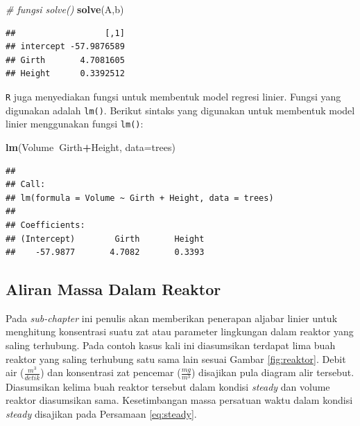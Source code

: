 \documentclass[]{book}
\newenvironment{Shaded}{\begin{snugshade}}{\end{snugshade}}
\newcommand{\CommentTok}[1]{\textcolor[rgb]{0.56,0.35,0.01}{\textit{#1}}}
\newcommand{\DataTypeTok}[1]{\textcolor[rgb]{0.13,0.29,0.53}{#1}}
\newcommand{\KeywordTok}[1]{\textcolor[rgb]{0.13,0.29,0.53}{\textbf{#1}}}
\newcommand{\NormalTok}[1]{#1}
\newcommand{\OperatorTok}[1]{\textcolor[rgb]{0.81,0.36,0.00}{\textbf{#1}}}
\theoremstyle{definition}
\theoremstyle{definition}
\theoremstyle{definition}
\theoremstyle{remark}
\begin{document}
\begin{Shaded}
\begin{Highlighting}[]
\CommentTok{# fungsi solve()}
\KeywordTok{solve}\NormalTok{(A,b)}
\end{Highlighting}
\end{Shaded}

\begin{verbatim}
##                  [,1]
## intercept -57.9876589
## Girth       4.7081605
## Height      0.3392512
\end{verbatim}

\texttt{R} juga menyediakan fungsi untuk membentuk model regresi linier. Fungsi yang digunakan adalah \texttt{lm()}. Berikut sintaks yang digunakan untuk membentuk model linier menggunakan fungsi \texttt{lm()}:

\begin{Shaded}
\begin{Highlighting}[]
\KeywordTok{lm}\NormalTok{(Volume}\OperatorTok{~}\NormalTok{Girth}\OperatorTok{+}\NormalTok{Height, }\DataTypeTok{data=}\NormalTok{trees)}
\end{Highlighting}
\end{Shaded}

\begin{verbatim}
## 
## Call:
## lm(formula = Volume ~ Girth + Height, data = trees)
## 
## Coefficients:
## (Intercept)        Girth       Height  
##    -57.9877       4.7082       0.3393
\end{verbatim}

\hypertarget{reaktorkimia}{%
\subsection{Aliran Massa Dalam Reaktor}\label{reaktorkimia}}

Pada \emph{sub-chapter} ini penulis akan memberikan penerapan aljabar linier untuk menghitung konsentrasi suatu zat atau parameter lingkungan dalam reaktor yang saling terhubung. Pada contoh kasus kali ini diasumsikan terdapat lima buah reaktor yang saling terhubung satu sama lain sesuai Gambar \ref{fig:reaktor}. Debit air (\(\frac{m^{3}}{detik}\)) dan konsentrasi zat pencemar (\(\frac{mg}{m^3}\)) disajikan pula diagram alir tersebut. Diasumsikan kelima buah reaktor tersebut dalam kondisi \emph{steady} dan volume reaktor diasumsikan sama. Kesetimbangan massa persatuan waktu dalam kondisi \emph{steady} disajikan pada Persamaan \eqref{eq:steady}.
\end{document}
